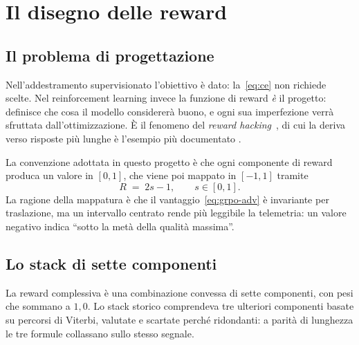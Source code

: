 \chapter{Il disegno delle reward}
\label{cap:reward}

\section{Il problema di progettazione}

Nell'addestramento supervisionato l'obiettivo è dato: la~\eqref{eq:ce} non
richiede scelte. Nel reinforcement learning invece la funzione di reward
\emph{è} il progetto: definisce che cosa il modello considererà buono, e ogni sua
imperfezione verrà sfruttata dall'ottimizzazione. È il fenomeno del
\emph{reward hacking}~\cite{amodei2016concrete,gao2022overoptimization}, di cui
la deriva verso risposte più lunghe è l'esempio più documentato
\cite{singhal2023length}.

La convenzione adottata in questo progetto è che ogni componente di reward
produca un valore in $[0,1]$, che viene poi mappato in $[-1,1]$ tramite
\begin{equation}
  \label{eq:reward-map}
  R \;=\; 2s - 1, \qquad s \in [0,1].
\end{equation}
La ragione della mappatura è che il vantaggio~\eqref{eq:grpo-adv} è invariante
per traslazione, ma un intervallo centrato rende più leggibile la telemetria: un
valore negativo indica ``sotto la metà della qualità massima''.


\section{Lo stack di sette componenti}
\label{sec:reward-rimosse}

La reward complessiva è una combinazione convessa di sette componenti, con pesi
che sommano a $1{,}0$. Lo stack storico comprendeva tre ulteriori componenti
basate su percorsi di Viterbi, valutate e scartate perché ridondanti: a parità di
lunghezza le tre formule collassano sullo stesso segnale.

